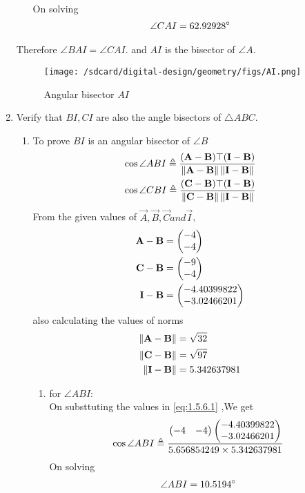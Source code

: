 \documentclass[11pt]{book}
\begin{document}
\begin{enumerate}[label=\thesection.\arabic*.,ref=\thesection.\theenumi]
\begin{enumerate}
\begin{align}
    \end{align}
    On solving 
    \begin{align}
        \angle CAI = 62.92928\degree
    \end{align}
\end{enumerate}
Therefore $\angle BAI = \angle CAI.$ and $AI$ is the bisector of $\angle A$. 
\begin{figure}[H]
\texttt{[image: /sdcard/digital-design/geometry/figs/AI.png]}
\caption{Angular bisector $AI$}
\label{fig:fig4}
\end{figure}

\item Verify that $BI, CI$ are also the angle bisectors of $\triangle ABC$. \\
\solution
\begin{enumerate}
    \item To prove $BI$ is an angular bisector of $ \angle B$
\begin{align}
\label{eq:1.5.6.1}
\cos{\angle ABI} \triangleq \frac{(\vec{A}-\vec{B})\top(\vec{I}-\vec{B})}{\norm{\vec{A}-\vec{B}}\norm{\vec{I}-\vec{B}}} \\
\cos{\angle CBI} \triangleq \frac{(\vec{C}-\vec{B})\top(\vec{I}-\vec{B})}{\norm{\vec{C}-\vec{B}}\norm{\vec{I}-\vec{B}}} 
\end{align}
From the given values of $\vec{A},\vec{B},\vec{C} and \vec{I}$,\\
\begin{align}
	\mathbf{A}-\mathbf{B} &=\begin{pmatrix}-4\\-4\end{pmatrix} \\
	\mathbf{C}-\mathbf{B}&= \begin{pmatrix}-9\\-4\end{pmatrix} \\
 \mathbf{I}-\mathbf{B}  &=\begin{pmatrix}-4.40399822 \\ -3.02466201\end{pmatrix}
\end{align}
also calculating the values of norms
\begin{align}
	\left\lVert\mathbf{A}-\mathbf{B}\right\rVert &= \sqrt{32}\\
	\left\lVert\mathbf{C}-\mathbf{B}\right\rVert &= \sqrt{97} \\
 	\left\lVert\mathbf{I}-\mathbf{B}\right\rVert &= 5.342637981 \\
\end{align}


\begin{enumerate}
    \item for $\angle ABI$: \\
    On substtuting the values in  \eqref{eq:1.5.6.1} ,We get 
    \begin{align}
        \cos{\angle ABI} \triangleq \frac{\begin{pmatrix} -4 & -4\end{pmatrix}\begin{pmatrix}-4.40399822 \\ -3.02466201\end{pmatrix}}{ 5.656854249\times5.342637981} \\
    \end{align}
    On solving 
    \begin{align}
        \angle ABI = 10.5194\degree
    \end{align}
    

\end{enumerate}
\end{enumerate}
\end{enumerate}
\end{document}
